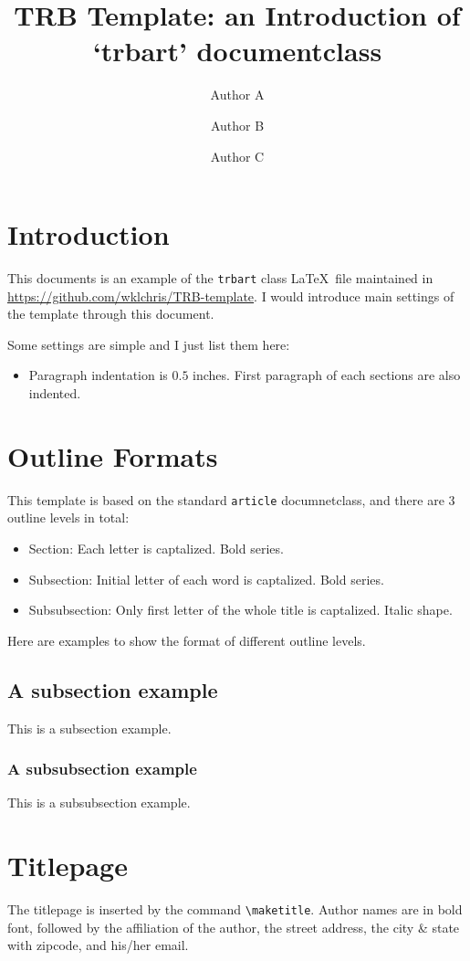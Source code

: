 \documentclass[12pt]{trbart}
\title{TRB Template: an Introduction of `trbart' documentclass}
\author{Author A}
\author{Author B}
\affil{University First\\ Address First\\ \email{first@example.com}}
\author{Author C}
\affil{University Second\\ Address Second\\ \email{second@example.com}}
\date{}
\begin{document}
\linenumbers{}
\maketitle


\section{Introduction}
This documents is an example of the \texttt{trbart} class \LaTeX\ file maintained in \url{https://github.com/wklchris/TRB-template}. I would introduce main settings of the template through this document.

Some settings are simple and I just list them here:
\begin{itemize}
    \item Paragraph indentation is \(0.5\) inches. First paragraph of each sections are also indented.
\end{itemize}


\section{Outline Formats}
This template is based on the standard \texttt{article} documnetclass, and there are 3 outline levels in total:
\begin{itemize}
    \item Section: Each letter is captalized. Bold series.
    \item Subsection: Initial letter of each word is captalized. Bold series.
    \item Subsubsection: Only first letter of the whole title is captalized. Italic shape.
\end{itemize}

Here are examples to show the format of different outline levels.

\subsection{A subsection example}
This is a subsection example.

\subsubsection{A subsubsection example}
This is a subsubsection example.


\section{Titlepage}
The titlepage is inserted by the command \verb+\maketitle+. Author names are in bold font, followed by the affiliation of the author, the street address, the city \& state with zipcode, and his/her email.
\end{document}
